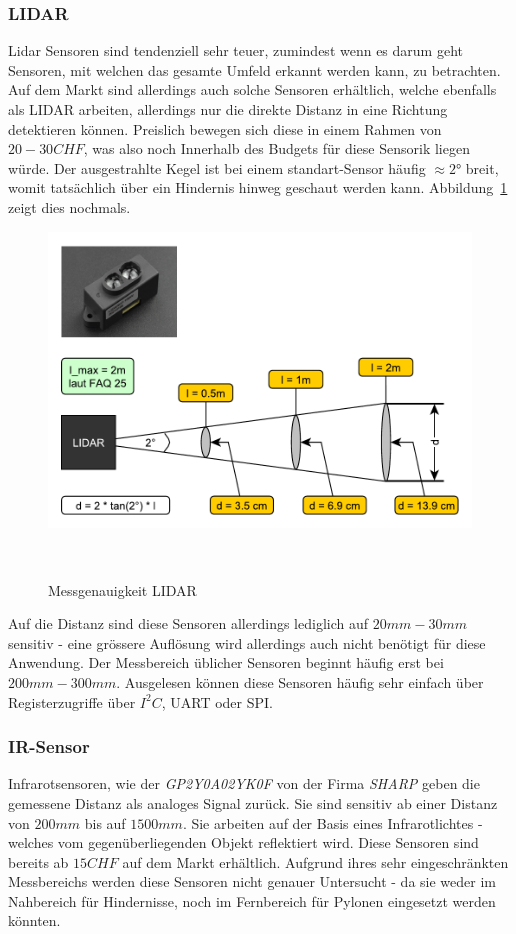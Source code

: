 \documentclass[main.tex]{subfiles} %
\begin{document}
\subsubsection*{LIDAR}
Lidar Sensoren sind tendenziell sehr teuer, zumindest wenn es darum geht
Sensoren, mit welchen das gesamte Umfeld erkannt werden kann, zu betrachten.
Auf dem Markt sind allerdings auch solche Sensoren erhältlich, welche ebenfalls
als LIDAR arbeiten, allerdings nur die direkte Distanz in eine Richtung
detektieren können. Preislich bewegen sich diese in einem Rahmen von $20 - 30
    CHF$, was also noch Innerhalb des Budgets für diese Sensorik liegen würde. Der
ausgestrahlte Kegel ist bei einem standart-Sensor häufig $\approx 2°$ breit,
womit tatsächlich über ein Hindernis hinweg geschaut werden kann.
Abbildung~\ref{fig:Genauigkeit_LIDAR} zeigt dies nochmals.

\begin{figure}[h!]
    \centering
    \includegraphics[width=0.75\linewidth]{./fig_Hinderniserkennung/Auslesegenauigkeit_LIDAR.pdf}
    \caption{Messgenauigkeit LIDAR}~\label{fig:Genauigkeit_LIDAR}
\end{figure}

Auf die Distanz sind diese Sensoren allerdings lediglich auf $20 mm - 30 mm$
sensitiv - eine grössere Auflösung wird allerdings auch nicht benötigt für
diese Anwendung. Der Messbereich üblicher Sensoren beginnt häufig erst bei $200
    mm - 300 mm$. Ausgelesen können diese Sensoren häufig sehr einfach über
Registerzugriffe über $I^2C$, UART oder SPI.

\subsubsection*{IR-Sensor}
Infrarotsensoren, wie der \textit{GP2Y0A02YK0F} von der Firma \textit{SHARP}
geben die gemessene Distanz als analoges Signal zurück. Sie sind sensitiv ab
einer Distanz von $200 mm$ bis auf $1500 mm$. Sie arbeiten auf der Basis eines
Infrarotlichtes - welches vom gegenüberliegenden Objekt reflektiert wird. Diese
Sensoren sind bereits ab $15 CHF$ auf dem Markt erhältlich. Aufgrund ihres sehr
eingeschränkten Messbereichs werden diese Sensoren nicht genauer Untersucht -
da sie weder im Nahbereich für Hindernisse, noch im Fernbereich für Pylonen
eingesetzt werden könnten.
\end{document}
